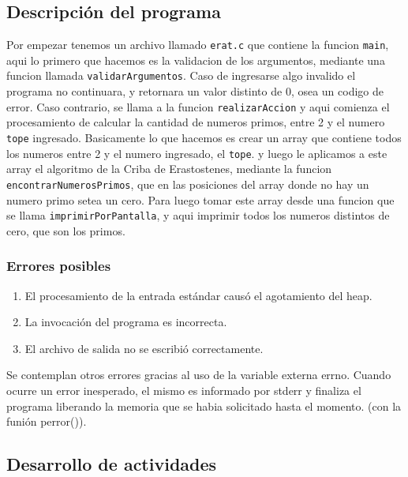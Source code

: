 \documentclass[a4paper,10pt]{article}
\begin{document}
\subsection {{\normalsize Descripción del programa}}

Por empezar tenemos un archivo llamado \texttt{erat.c} que contiene la funcion
\texttt{main}, aqui lo primero que hacemos es la validacion de los argumentos, mediante 
una funcion llamada \texttt{validarArgumentos}. Caso de ingresarse algo invalido 
el programa no continuara, y retornara un valor distinto de 0, osea un codigo de error. Caso contrario, 
se llama a la funcion \texttt{realizarAccion} y aqui comienza el procesamiento de calcular 
la cantidad de numeros primos, entre 2 y el numero \texttt{tope} ingresado. Basicamente lo que hacemos es 
crear un array que contiene todos los numeros entre 2 y el numero ingresado, el \texttt{tope}. 
y luego le aplicamos a este array el algoritmo de la Criba de Erastostenes, mediante la funcion \texttt{encontrarNumerosPrimos},
que en las posiciones del array donde no hay un numero primo setea un cero.
Para luego tomar este array desde una funcion que se llama \texttt{imprimirPorPantalla}, y aqui imprimir todos los numeros distintos
de cero, que son los primos.

\subsubsection {{\normalsize Errores posibles}}

\begin{enumerate}
\item El procesamiento de la entrada estándar causó el agotamiento del heap.
\item La invocación del programa es incorrecta.
\item El archivo de salida no se escribió correctamente.
\end{enumerate}

Se contemplan otros errores gracias al uso de la variable externa errno. 
Cuando ocurre un error inesperado, el mismo es informado por stderr y finaliza el programa
liberando la memoria que se habia solicitado hasta el momento.
(con la funión perror()).

\subsection{{\normalsize Desarrollo de actividades}}
\end{document}

